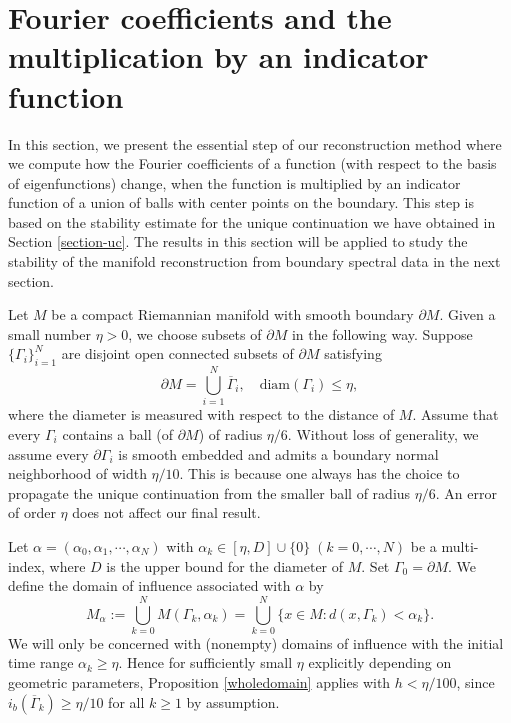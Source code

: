 \documentclass[11pt,letterpaper]{amsart}
\numberwithin{equation}{section}
\theoremstyle{definition}
\theoremstyle{plain}
\theoremstyle{definition}
\theoremstyle{plain}
\theoremstyle{definition}
\theoremstyle{plain}
\begin{document}
\section{Fourier coefficients and the multiplication by an indicator function}\label{section-projection}

In this section, we present the essential step of our reconstruction method where we compute how the Fourier coefficients of a function (with respect to the basis of eigenfunctions) change, when the function is multiplied by an indicator function of a union of balls with center points on the boundary. This step is based on the stability estimate for the unique continuation we have obtained in Section \ref{section-uc}. The results in this section will be applied to study the stability of the manifold reconstruction from boundary spectral data in the next section.

\smallskip
Let $M$ be a compact Riemannian manifold with smooth boundary $\partial M$. Given a small number $\eta>0$, we choose subsets of $\partial M$ in the following way. Suppose $\{\Gamma_i\}_{i=1}^N$ are disjoint open connected subsets of $\partial M$ satisfying
$$\partial M =\bigcup_{i=1}^N \overline{\Gamma}_i, \quad \textrm{diam}(\Gamma_i)\leqslant \eta,$$
where the diameter is measured with respect to the distance of $M$. Assume that every $\Gamma_i$ contains a ball (of $\partial M$) of radius $\eta/6$. Without loss of generality, we assume every $\partial\Gamma_i$ is smooth embedded and admits a boundary normal neighborhood of width $\eta/10$. This is because one always has the choice to propagate the unique continuation from the smaller ball of radius $\eta/6$. An error of order $\eta$ does not affect our final result. 

Let $\alpha=(\alpha_0,\alpha_1,\cdots,\alpha_N)$ with $\alpha_k\in [\eta, D]\cup\{0\}\; (k=0,\cdots,N)$ be a multi-index, where $D$ is the upper bound for the diameter of $M$. Set $\Gamma_0=\partial M$. We define the domain of influence associated with $\alpha$ by
\begin{equation}\label{Malpha}
M_{\alpha}:=\bigcup_{k=0}^N M(\Gamma_k, \alpha_k)=\bigcup_{k=0}^N \big\{ x \in M: d(x,\Gamma_k) < \alpha_k \big\}.
\end{equation}
We will only be concerned with (nonempty) domains of influence with the initial time range $\alpha_k\geqslant \eta$. Hence for sufficiently small $\eta$ explicitly depending on geometric parameters, Proposition \ref{wholedomain} applies with $h<\eta/100$, since $i_b(\overline{\Gamma}_k)\geqslant \eta/10$ for all $k\geqslant 1$ by assumption.
\end{document}
